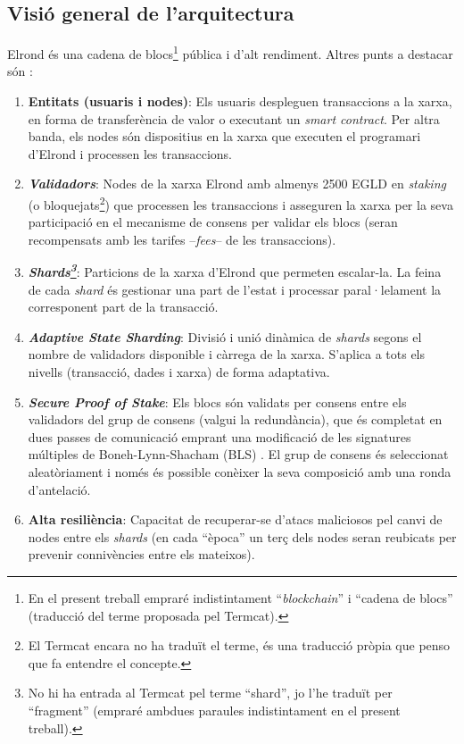 \documentclass[11pt,a4paper]{article}
\begin{document}
\subsection{Visió general de l'arquitectura}
Elrond és una cadena de blocs\footnote{En el present treball empraré indistintament ``\textit{blockchain}'' i ``cadena de blocs'' (traducció del terme proposada pel Termcat).} pública i d'alt rendiment. Altres punts a destacar són \cite{elrond2022}\cite{elrond2022-2}:
\begin{enumerate}
  \item \textbf{Entitats (usuaris i nodes)}: Els usuaris despleguen transaccions a la xarxa, en forma de transferència de valor o executant un \textit{smart contract}. Per altra banda, els nodes són dispositius en la xarxa que executen el programari d'Elrond i processen les transaccions.
  \item \textbf{\textit{Validadors}}: Nodes de la xarxa Elrond amb almenys 2500 EGLD en \textit{staking} (o bloquejats\footnote{El Termcat encara no ha traduït el terme, és una traducció pròpia que penso que fa entendre el concepte.}) que processen les transaccions i asseguren la xarxa per la seva participació en el mecanisme de consens per validar els blocs (seran recompensats amb les tarifes –\textit{fees}– de les transaccions).
  \item \textbf{\textit{Shards\footnote{No hi ha entrada al Termcat pel terme ``shard'', jo l'he traduït per ``fragment'' (empraré ambdues paraules indistintament en el present treball).}}}: Particions de la xarxa d'Elrond que permeten escalar-la. La feina de cada \textit{shard} és gestionar una part de l'estat i processar paral·lelament la corresponent part de la transacció.
  \item \textbf{\textit{Adaptive State Sharding}}: Divisió i unió dinàmica de \textit{shards} segons el nombre de validadors disponible i càrrega de la xarxa. S'aplica a tots els nivells (transacció, dades i xarxa) de forma adaptativa.
  \item \textbf{\textit{Secure Proof of Stake}}: Els blocs són validats per consens entre els validadors del grup de consens (valgui la redundància), que és completat en dues passes de comunicació emprant una modificació de les signatures múltiples de Boneh-Lynn-Shacham (BLS) \cite{Boneh2004}. El grup de consens és seleccionat aleatòriament i només és possible conèixer la seva composició amb una ronda d'antelació.
  \item \textbf{Alta resiliència}: Capacitat de recuperar-se d'atacs maliciosos pel canvi de nodes entre els \textit{shards} (en cada ``època'' un terç dels nodes seran reubicats per prevenir connivències entre els mateixos).

\end{enumerate}
\end{document}
